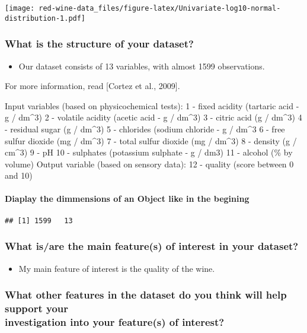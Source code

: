 \documentclass[]{article}
\providecommand{\tightlist}{%
  \setlength{\itemsep}{0pt}\setlength{\parskip}{0pt}}
\let\oldparagraph\paragraph
\renewcommand{\paragraph}[1]{\oldparagraph{#1}\mbox{}}
\begin{document}
\texttt{[image: red-wine-data\_files/figure-latex/Univariate-log10-normal-distribution-1.pdf]}

\subsubsection{What is the structure of your
dataset?}\label{what-is-the-structure-of-your-dataset}

\begin{itemize}
\tightlist
\item
  Our dataset consists of 13 variables, with almost 1599 observations.
\end{itemize}

For more information, read {[}Cortez et al., 2009{]}.

Input variables (based on physicochemical tests): 1 - fixed acidity
(tartaric acid - g / dm\^{}3) 2 - volatile acidity (acetic acid - g /
dm\^{}3) 3 - citric acid (g / dm\^{}3) 4 - residual sugar (g / dm\^{}3)
5 - chlorides (sodium chloride - g / dm\^{}3 6 - free sulfur dioxide (mg
/ dm\^{}3) 7 - total sulfur dioxide (mg / dm\^{}3) 8 - density (g /
cm\^{}3) 9 - pH 10 - sulphates (potassium sulphate - g / dm3) 11 -
alcohol (\% by volume) Output variable (based on sensory data): 12 -
quality (score between 0 and 10)

\paragraph{Diaplay the dimmensions of an Object like in the
begining}\label{diaplay-the-dimmensions-of-an-object-like-in-the-begining}

\begin{verbatim}
## [1] 1599   13
\end{verbatim}

\subsubsection{What is/are the main feature(s) of interest in your
dataset?}\label{what-isare-the-main-features-of-interest-in-your-dataset}

\begin{itemize}
\tightlist
\item
  My main feature of interest is the quality of the wine.
\end{itemize}

\subsubsection{\texorpdfstring{What other features in the dataset do you
think will help support your\\
investigation into your feature(s) of
interest?}{What other features in the dataset do you think will help support your investigation into your feature(s) of interest?}}\label{what-other-features-in-the-dataset-do-you-think-will-help-support-your-investigation-into-your-features-of-interest}
\end{document}
